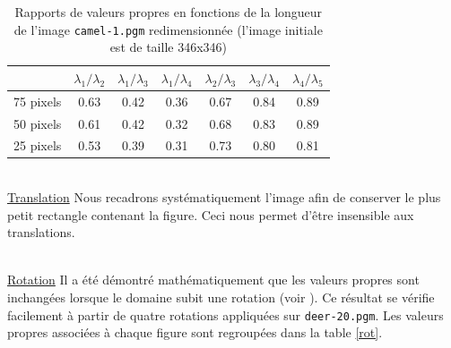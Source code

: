 \documentclass[a4paper,10pt]{article} %
\theoremstyle{definition} %
\begin{document}
\begin{table}[H]
  \begin{center}
    \begin{tabular}{l | c c c c c c}
                & $\lambda_1 / \lambda_2$ & $\lambda_1 / \lambda_3$ & $\lambda_1 / \lambda_4$ & $\lambda_2 / \lambda_3$ & $\lambda_3 / \lambda_4$ & $\lambda_4 / \lambda_5$ \\ \hline
      75 pixels & 0.63 & 0.42 & 0.36 & 0.67 & 0.84 & 0.89 \\
      50 pixels & 0.61 & 0.42 & 0.32 & 0.68 & 0.83 & 0.89 \\
      25 pixels & 0.53 & 0.39 & 0.31 & 0.73 & 0.80 & 0.81
    \end{tabular}
  \end{center}
\caption{Rapports de valeurs propres en fonctions de la longueur de l'image \texttt{camel-1.pgm} redimensionnée (l'image initiale est de taille 346x346)}
\label{scale}
\end{table}

~\\
\underline{Translation} Nous recadrons systématiquement l'image afin de conserver le plus petit rectangle contenant la figure. Ceci nous permet d'être insensible aux translations.

~\\
\underline{Rotation} Il a été démontré mathématiquement que les valeurs propres sont inchangées lorsque le domaine subit une rotation (voir \cite{Zuliani04}). Ce résultat se vérifie facilement à partir de quatre rotations appliquées sur \texttt{deer-20.pgm}. Les valeurs propres associées à chaque figure sont regroupées dans la table \ref{rot}.
\end{document}
